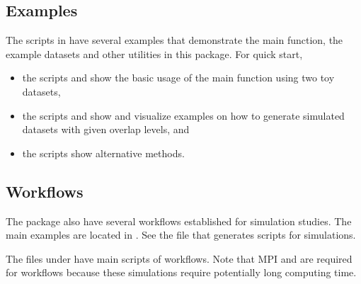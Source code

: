 \subsection[Examples]{Examples}
The scripts in  have several examples that demonstrate
the main function, the example datasets and other utilities in this package.
For quick start,
\begin{itemize}
\item
the scripts  and 
show the basic usage of the main function  using
two toy datasets,
\item
the scripts  and
 show and visualize
examples on how to generate simulated datasets with given overlap levels, and
\item
the scripts  show alternative methods.
\end{itemize}


\subsection[Workflows]{Workflows}
\label{sec:workflows}
The package also have several workflows established for simulation studies.
The main examples are located in .
See the file  that generates scripts for simulations.

The files under  have main scripts of
workflows.
Note that MPI and  are required for workflows because these
simulations require potentially long computing time.

